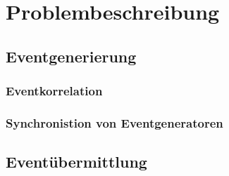 %

\chapter{Problembeschreibung}

\section{Eventgenerierung}
\subsection{Eventkorrelation}
\subsection{Synchronistion von Eventgeneratoren}
\section{Eventübermittlung}

